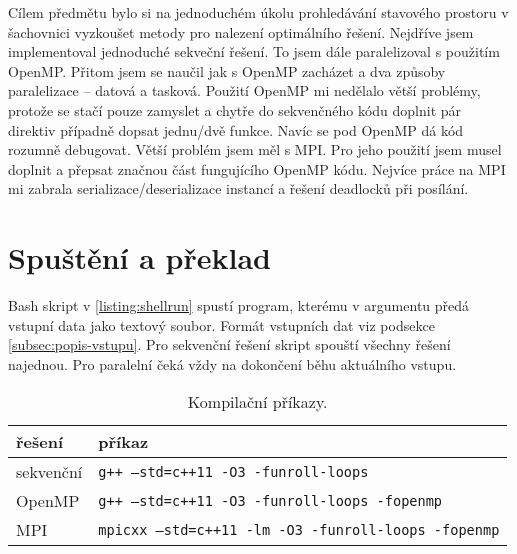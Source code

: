 \documentclass{article}
\newcommand{\const}[1]{\texttt{#1}}
\begin{document}
    Cílem předmětu bylo si na jednoduchém úkolu prohledávání stavového prostoru v šachovnici vyzkoušet metody pro
    nalezení optimálního řešení. Nejdříve jsem implementoval jednoduché sekveční řešení. To jsem dále paralelizoval
    s použitím OpenMP. Přitom jsem se naučil jak s OpenMP zacházet a dva způsoby paralelizace – datová a tasková.
    Použití OpenMP mi nedělalo větší problémy, protože se stačí pouze zamyslet a chytře do sekvenčného kódu doplnit
    pár direktiv případně dopsat jednu/dvě funkce. Navíc se pod OpenMP dá kód rozumně debugovat. Větší problém jsem
    měl s MPI. Pro jeho použití jsem musel doplnit a přepsat značnou část fungujícího OpenMP kódu. Nejvíce práce na
    MPI mi zabrala serializace/deserializace instancí a řešení deadlocků při posílání.

    \newpage
    \section{Spuštění a překlad}
    Bash skript v \ref{listing:shellrun} spustí program, kterému v argumentu předá vstupní data jako textový soubor.
    Formát vstupních dat viz podsekce \ref{subsec:popis-vstupu}. Pro sekvenční řešení skript spouští všechny řešení najednou.
    Pro paralelní čeká vždy na dokončení běhu aktuálního vstupu.

    \begin{table}[hb]
        \centering
        \begin{tabular}{|l|l|}
            \hline
            řešení    & příkaz                                      \\ \hline
            sekvenční & \const{g++ --std=c++11 -O3 -funroll-loops}          \\ \hline
            OpenMP    & \const{g++ --std=c++11 -O3 -funroll-loops -fopenmp} \\ \hline
            MPI       & \const{mpicxx --std=c++11 -lm -O3 -funroll-loops -fopenmp}   \\ \hline
        \end{tabular}
        \caption{Kompilační příkazy.}
        \label{tab:comp}
    \end{table}
\end{document}
